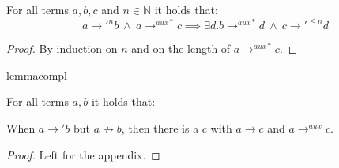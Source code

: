 \begin{corollary}
\label{cor:cdpauxcor}

For all terms $a,b,c$ and $n \in \mathbb{N}$ it holds that:
\[
a {\longrightarrow'}^n b ~ \land ~ a {\longrightarrow^{aux}}^* c \implies \exists d . b {\longrightarrow^{aux}}^* d ~ \land ~ c {\longrightarrow'}^{\leq n} d
\]

\begin{proof}

By induction on $n$ and on the length of $a {\longrightarrow^{aux}}^* c$.

\end{proof}

\end{corollary}

\begin{restatable}[Complementarity]{lemma}{compl}
\label{lem:compl}

For all terms $a,b$ it holds that:

When $a \longrightarrow' b$ but $a \not\longrightarrow b$, then there is a $c$ with $a \longrightarrow c$ and $a \longrightarrow^{aux} c$.

\end{restatable}

\begin{proof}
Left for the appendix.
\end{proof}

